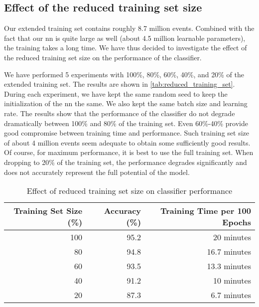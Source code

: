 \subsection{Effect of the reduced training set size}

Our extended training set contains roughly 8.7 million events. Combined with the fact that our \gls{nn} is quite large
as well (about 4.5 million learnable parameters), the training takes a long time. We have thus decided to investigate
the effect of the reduced training set size on the performance of the classifier.

We have performed 5 experiments with 100\%, 80\%, 60\%, 40\%, and 20\% of the extended training set. The results are
shown in \autoref{tab:reduced_training_set}. During each experiment, we have kept the same random seed to keep the
initialization of the \gls{nn} the same. We also kept the same batch size and learning rate. The results show that the
performance of the classifier do not degrade dramatically between 100\% and 80\% of the training set. Even 60\%-40\%
provide good compromise between training time and performance. Such training set size of about 4 million events seem
adequate to obtain some sufficiently good results. Of course, for maximum performance, it is best to use the full
training set. When dropping to 20\% of the training set, the performance degrades significantly and does not accurately
represent the full potential of the model.

\begin{table}[htbp]
    \centering
    \begin{tabular}{rrr}
        \toprule
        \textbf{Training Set Size (\%)} & \textbf{Accuracy (\%)} & \textbf{Training Time per 100 Epochs} \\
        \midrule
        100                             & 95.2                   & 20 minutes                            \\
        80                              & 94.8                   & 16.7 minutes                          \\
        60                              & 93.5                   & 13.3 minutes                          \\
        40                              & 91.2                   & 10 minutes                            \\
        20                              & 87.3                   & 6.7 minutes                           \\
        \bottomrule
    \end{tabular}
    \caption{Effect of reduced training set size on classifier performance}
    \label{tab:reduced_training_set}
\end{table}
